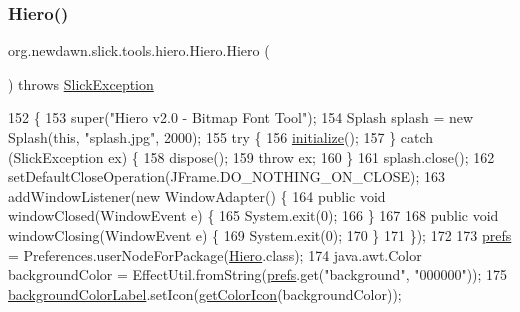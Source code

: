 \subsubsection{\texorpdfstring{Hiero()}{Hiero()}}
{\footnotesize\ttfamily org.\+newdawn.\+slick.\+tools.\+hiero.\+Hiero.\+Hiero (\begin{DoxyParamCaption}{ }\end{DoxyParamCaption}) throws \mbox{\hyperlink{classorg_1_1newdawn_1_1slick_1_1_slick_exception}{Slick\+Exception}}\hspace{0.3cm}{\ttfamily [inline]}}


\begin{DoxyCode}
152                                           \{
153         super(\textcolor{stringliteral}{"Hiero v2.0 - Bitmap Font Tool"});
154         Splash splash = \textcolor{keyword}{new} Splash(\textcolor{keyword}{this}, \textcolor{stringliteral}{"splash.jpg"}, 2000);
155         \textcolor{keywordflow}{try} \{
156             \mbox{\hyperlink{classorg_1_1newdawn_1_1slick_1_1tools_1_1hiero_1_1_hiero_a03f0e98d12c2117ec8521ded2b737c99}{initialize}}();
157         \} \textcolor{keywordflow}{catch} (SlickException ex) \{
158             dispose();
159             \textcolor{keywordflow}{throw} ex;
160         \}
161         splash.close();
162         setDefaultCloseOperation(JFrame.DO\_NOTHING\_ON\_CLOSE);
163         addWindowListener(\textcolor{keyword}{new} WindowAdapter() \{
164             \textcolor{keyword}{public} \textcolor{keywordtype}{void} windowClosed(WindowEvent e) \{
165                 System.exit(0);
166             \}
167 
168             \textcolor{keyword}{public} \textcolor{keywordtype}{void} windowClosing(WindowEvent e) \{
169                 System.exit(0);
170             \}
171         \});
172         
173         \mbox{\hyperlink{classorg_1_1newdawn_1_1slick_1_1tools_1_1hiero_1_1_hiero_aa7062bea3ffd4639b589cd06000dbfc6}{prefs}} = Preferences.userNodeForPackage(\mbox{\hyperlink{classorg_1_1newdawn_1_1slick_1_1tools_1_1hiero_1_1_hiero_ad35908dac0e9755fd418874dff6d2dcd}{Hiero}}.class);
174         java.awt.Color backgroundColor = EffectUtil.fromString(\mbox{\hyperlink{classorg_1_1newdawn_1_1slick_1_1tools_1_1hiero_1_1_hiero_aa7062bea3ffd4639b589cd06000dbfc6}{prefs}}.get(\textcolor{stringliteral}{"background"}, \textcolor{stringliteral}{"000000"}));
175         \mbox{\hyperlink{classorg_1_1newdawn_1_1slick_1_1tools_1_1hiero_1_1_hiero_a04c540a8cc98417075e589a6aa7e0ad1}{backgroundColorLabel}}.setIcon(\mbox{\hyperlink{classorg_1_1newdawn_1_1slick_1_1tools_1_1hiero_1_1_hiero_a965ca93fb655336c8320938445d75ece}{getColorIcon}}(backgroundColor));

\end{DoxyCode}
